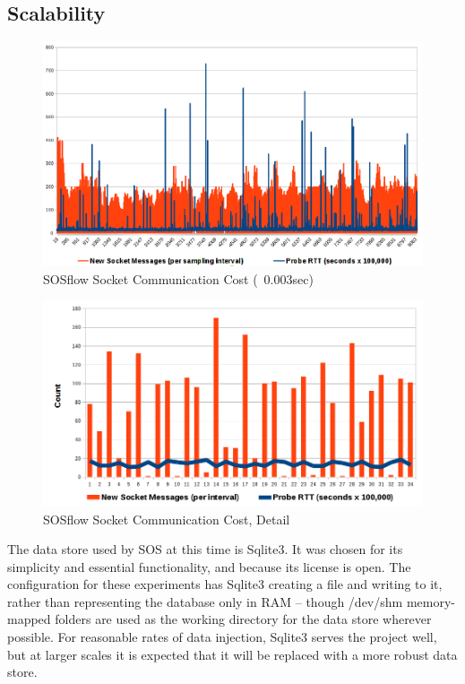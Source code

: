 \subsection{Scalability}


\begin{figure}[!t]
\centering
\includegraphics[width=5in]{images/icebox_api_cost_when_slam.png}
\caption{SOSflow Socket Communication Cost (~0.003sec)}
\label{sock_cost}
\end{figure}


\begin{figure}[!t]
\centering
\includegraphics[width=5in]{images/icebox_api_cost_zoom.png}
\caption{SOSflow Socket Communication Cost, Detail}
\label{sock_cost_detail}
\end{figure}


The data store used by SOS at this time is Sqlite3. It was chosen for
its simplicity and essential functionality, and because its license
is open. The configuration for these experiments has Sqlite3 creating
a file and writing to it, rather than representing the database only in
RAM -- though /dev/shm memory-mapped folders are used as the working
directory for the data store wherever possible. For reasonable rates of
data injection, Sqlite3 serves the project well, but at larger scales
it is expected that it will be replaced with a more robust data store.




